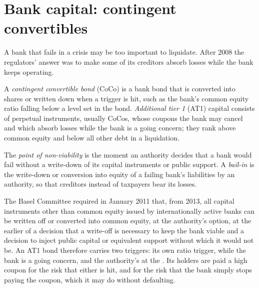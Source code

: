 \section{Bank capital: contingent convertibles}

A bank that fails in a crisis may be too important to liquidate. After 2008 the
regulators' answer was to make some of its creditors absorb losses while the bank
keeps operating.

\begin{definition}\label{def:m2:distressed-sovereign-and-bank-capital-credit:coco}
A \emph{contingent convertible bond} (CoCo) is a
bank bond that is converted into shares or written down when a trigger is hit, such as
the bank's common equity ratio falling below a level set in the bond. \emph{Additional
tier 1} (AT1) capital consists of perpetual instruments,
usually CoCos, whose coupons the bank may cancel and which absorb losses while the
bank is a going concern; they rank above common equity and below all other debt in a
liquidation.
\end{definition}

\begin{definition}\label{def:m2:distressed-sovereign-and-bank-capital-credit:pon}
The \emph{point of non-viability} is the moment an
authority decides that a bank would fail without a write-down of its capital
instruments or public support. A \emph{bail-in} is the write-down or
conversion into equity of a failing bank's liabilities by an authority, so that
creditors instead of taxpayers bear its losses.
\end{definition}

The Basel Committee required in January 2011 that, from 2013, all capital instruments
other than common equity issued by internationally active banks can be written off or
converted into common equity, at the authority's option, at the earlier of a decision
that a write-off is necessary to keep the bank viable and a decision to inject public
capital or equivalent support without which it would not be. An AT1 bond therefore
carries two triggers: its own ratio trigger, while the bank is a going concern, and
the authority's at the . Its holders are paid a high coupon for
the risk that either is hit, and for the risk that the bank simply stops paying the
coupon, which it may do without defaulting.

